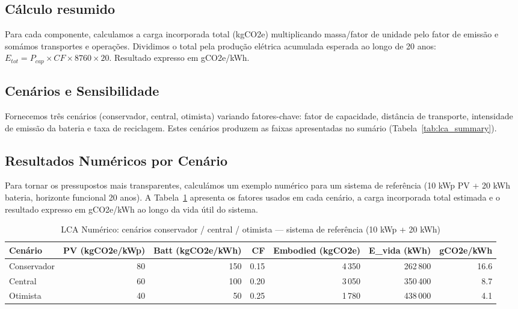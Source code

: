 \documentclass[12pt, a4paper]{article}
\begin{document}
\subsection{Cálculo resumido}
Para cada componente, calculamos a carga incorporada total (kgCO2e) multiplicando massa/fator
de unidade pelo fator de emissão e somámos transportes e operações. Dividimos o total pela
produção elétrica acumulada esperada ao longo de 20 anos: $E_{tot}=P_{cap}\times CF\times 8760\times 20$.
Resultado expresso em gCO2e/kWh.

\subsection{Cenários e Sensibilidade}
Fornecemos três cenários (conservador, central, otimista) variando fatores-chave: fator de
capacidade, distância de transporte, intensidade de emissão da bateria e taxa de reciclagem.
Estes cenários produzem as faixas apresentadas no sumário (Tabela~\ref{tab:lca_summary}).

\subsection{Resultados Numéricos por Cenário}
Para tornar os pressupostos mais transparentes, calculámos um exemplo numérico para um
sistema de referência (10 kWp PV + 20 kWh bateria, horizonte funcional 20 anos). A Tabela~\ref{tab:lca_numeric}
apresenta os fatores usados em cada cenário, a carga incorporada total estimada e o resultado
expresso em gCO2e/kWh ao longo da vida útil do sistema.

\begin{table}[H]
\centering
\caption{LCA Numérico: cenários conservador / central / otimista — sistema de referência (10 kWp + 20 kWh)}
\label{tab:lca_numeric}
\footnotesize
\begin{tabular}{lrrrrrr}
\toprule
\textbf{Cenário} & \textbf{PV (kgCO2e/kWp)} & \textbf{Batt (kgCO2e/kWh)} & \textbf{CF} & \textbf{Embodied (kgCO2e)} & \textbf{E\_vida (kWh)} & \textbf{gCO2e/kWh} \\
\midrule
Conservador & 80 & 150 & 0.15 & 4\,350 & 262\,800 & 16.6 \\
Central & 60 & 100 & 0.20 & 3\,050 & 350\,400 & 8.7 \\
Otimista & 40 & 50 & 0.25 & 1\,780 & 438\,000 & 4.1 \\
\bottomrule
\end{tabular}
\end{table}
\end{document}
